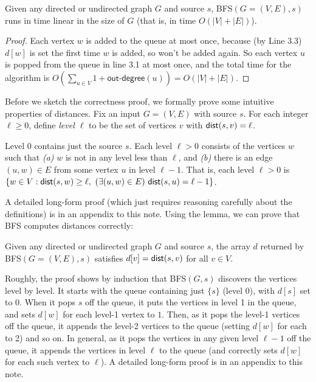 \documentclass[11pt]{article}
\begin{document}
\begin{lemma}
  Given any directed or undirected graph $G$ and source $s$,
  \textsf{BFS}$(G=(V,E), s)$ runs in time linear in the size of $G$
  (that is, in time $O(|V|+|E|)$).
\end{lemma}
\begin{proof}
  Each vertex $w$ is added to the queue at most once,
  because (by Line 3.3) $d[w]$ is set the first time $w$ is added,
  so won't be added again.
  So each vertex $u$ is popped from the queue in line 3.1 at most once,
  and the total time for the algorithm is 
  $O(\sum_{u\in V} 1 + \textsf{out-degree}(u)) = O(|V|+|E|)$. 
\end{proof}


Before we sketch the correctness proof,
we formally prove some intuitive properties of distances.
Fix an input $G=(V,E)$ with source $s$.
For each integer $\ell\ge 0$, define \emph{level $\ell$} to be the set of vertices $v$ with $\operatorname{\sf dist}(s, v) = \ell$.

\begin{lemma}[levels]%
  Level 0 contains just the source $s$. 
  Each level $\ell>0$ consists of the vertices $w$ such that
  \emph{(a)} $w$ is not in any level less than $\ell$, and
  \emph{(b)} there is an edge $(u, w)\in E$ from some vertex $u$ in level $\ell-1$.
  That is, each level $\ell>0$ is $\{w\in V: \operatorname{\sf dist}(s, w) \ge \ell,~(\exists (u,w)\in E)\,\operatorname{\sf dist}(s, u) = \ell-1\}$.
\end{lemma}
A detailed long-form proof (which just requires reasoning carefully about the definitions)
is in an appendix to this note.
Using the lemma,
we can prove that \textsf{BFS} computes distances correctly:

\begin{lemma}[correctness]%
  Given any directed or undirected graph $G$ and source $s$,
  the array $d$ returned by \textsf{BFS}$(G=(V,E), s)$
  satisfies $d[v] = \operatorname{\sf dist}(s, v)$ for all $v\in V$.
\end{lemma}
Roughly, the proof shows by induction that
\textsf{BFS}$(G, s)$
discovers the vertices level by level.
It starts with the queue containing just $\{s\}$ (level 0), with $d[s]$ set to 0.
When it pops $s$ off the queue, it puts the vertices in level 1 in the queue,
and sets $d[w]$ for each level-1 vertex to $1$.
Then, as it pops the level-1 vertices off the queue,
it appends the level-2 vertices to the queue (setting $d[w]$ for each to 2) and so on.
In general, as it pops the vertices in any given level $\ell-1$ off the queue,
it appends the vertices in level $\ell$ to the queue
(and correctly sets $d[w]$ for each such vertex to $\ell$).
A detailed long-form proof is in an appendix to this note.
\end{document}
